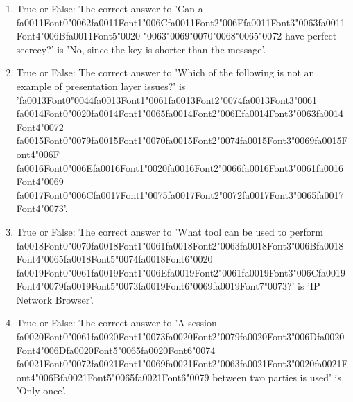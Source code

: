 \documentclass[12pt]{article}
\begin{document}
\begin{enumerate}[label=\arabic*.]
\item True or False: The correct answer to 'Can a {\csname fa0011Font0\endcsname\char"0062}{\csname fa0011Font1\endcsname\char"006C}{\csname fa0011Font2\endcsname\char"006F}{\csname fa0011Font3\endcsname\char"0063}{\csname fa0011Font4\endcsname\char"006B}{\csname fa0011Font5\endcsname\char"0020} {\char"0063}{\char"0069}{\char"0070}{\char"0068}{\char"0065}{\char"0072} have perfect secrecy?' is 'No, since the key is shorter than the message'.
\item True or False: The correct answer to 'Which of the following is not an example of presentation layer issues?' is '{\csname fa0013Font0\endcsname\char"0044}{\csname fa0013Font1\endcsname\char"0061}{\csname fa0013Font2\endcsname\char"0074}{\csname fa0013Font3\endcsname\char"0061} {\csname fa0014Font0\endcsname\char"0020}{\csname fa0014Font1\endcsname\char"0065}{\csname fa0014Font2\endcsname\char"006E}{\csname fa0014Font3\endcsname\char"0063}{\csname fa0014Font4\endcsname\char"0072} {\csname fa0015Font0\endcsname\char"0079}{\csname fa0015Font1\endcsname\char"0070}{\csname fa0015Font2\endcsname\char"0074}{\csname fa0015Font3\endcsname\char"0069}{\csname fa0015Font4\endcsname\char"006F} {\csname fa0016Font0\endcsname\char"006E}{\csname fa0016Font1\endcsname\char"0020}{\csname fa0016Font2\endcsname\char"0066}{\csname fa0016Font3\endcsname\char"0061}{\csname fa0016Font4\endcsname\char"0069} {\csname fa0017Font0\endcsname\char"006C}{\csname fa0017Font1\endcsname\char"0075}{\csname fa0017Font2\endcsname\char"0072}{\csname fa0017Font3\endcsname\char"0065}{\csname fa0017Font4\endcsname\char"0073}'.
\item True or False: The correct answer to 'What tool can be used to perform {\csname fa0018Font0\endcsname\char"0070}{\csname fa0018Font1\endcsname\char"0061}{\csname fa0018Font2\endcsname\char"0063}{\csname fa0018Font3\endcsname\char"006B}{\csname fa0018Font4\endcsname\char"0065}{\csname fa0018Font5\endcsname\char"0074}{\csname fa0018Font6\endcsname\char"0020} {\csname fa0019Font0\endcsname\char"0061}{\csname fa0019Font1\endcsname\char"006E}{\csname fa0019Font2\endcsname\char"0061}{\csname fa0019Font3\endcsname\char"006C}{\csname fa0019Font4\endcsname\char"0079}{\csname fa0019Font5\endcsname\char"0073}{\csname fa0019Font6\endcsname\char"0069}{\csname fa0019Font7\endcsname\char"0073}?' is 'IP Network Browser'.
\item True or False: The correct answer to 'A session {\csname fa0020Font0\endcsname\char"0061}{\csname fa0020Font1\endcsname\char"0073}{\csname fa0020Font2\endcsname\char"0079}{\csname fa0020Font3\endcsname\char"006D}{\csname fa0020Font4\endcsname\char"006D}{\csname fa0020Font5\endcsname\char"0065}{\csname fa0020Font6\endcsname\char"0074} {\csname fa0021Font0\endcsname\char"0072}{\csname fa0021Font1\endcsname\char"0069}{\csname fa0021Font2\endcsname\char"0063}{\csname fa0021Font3\endcsname\char"0020}{\csname fa0021Font4\endcsname\char"006B}{\csname fa0021Font5\endcsname\char"0065}{\csname fa0021Font6\endcsname\char"0079} between two parties is used' is 'Only once'.

\end{enumerate}
\end{document}
